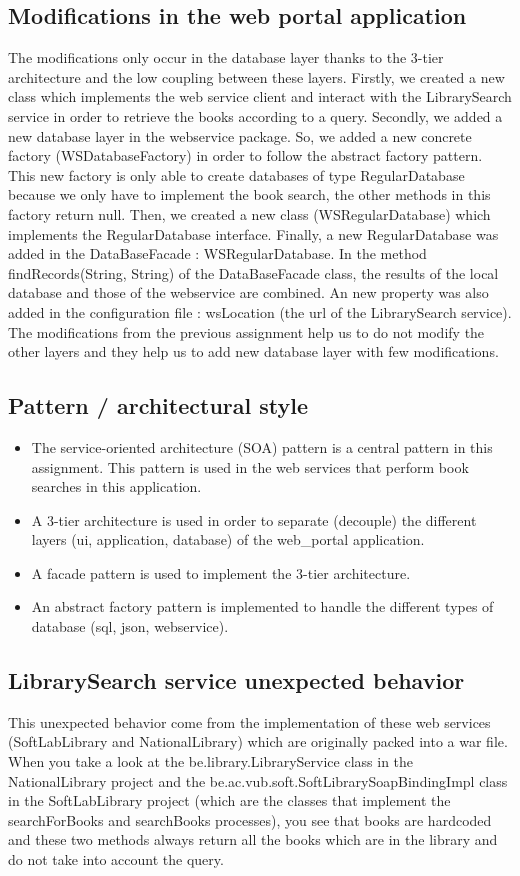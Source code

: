 \documentclass[a4paper,10pt]{article}
\begin{document}
\subsection{Modifications in the web portal application}
The modifications only occur in the database layer thanks to the 3-tier architecture and the low coupling between these layers. Firstly, we created a new class which implements the web service client and interact with the LibrarySearch service in order to retrieve the books according to a query. Secondly, we added a new database layer in the webservice package. So, we added a new concrete factory (WSDatabaseFactory) in order to follow the abstract factory pattern. This new factory is only able to create databases of type RegularDatabase because we only have to implement the book search, the other methods in this factory return null. Then, we created a new class (WSRegularDatabase) which implements the RegularDatabase interface. Finally, a new RegularDatabase was added in the DataBaseFacade : WSRegularDatabase. In the method findRecords(String, String) of the DataBaseFacade class, the results of the local database and those of the webservice are combined. An new property was also added in the configuration file : wsLocation (the url of the LibrarySearch service).\\
The modifications from the previous assignment help us to do not modify the other layers and they help us to add new database layer with few modifications.

\subsection{Pattern / architectural style}
\begin{itemize}
\item The service-oriented architecture (SOA) pattern is a central pattern in this assignment. This pattern is used in the web services that perform book searches in this application.
\item A 3-tier architecture is used in order to separate (decouple) the different layers (ui, application, database) of the web\_portal application.
\item A facade pattern is used to implement the 3-tier architecture.
\item An abstract factory pattern is implemented to handle the different types of database (sql, json, webservice).
\end{itemize}


\subsection{LibrarySearch service unexpected behavior}
This unexpected behavior come from the implementation of these web services (SoftLabLibrary and NationalLibrary) which are originally packed into a war file. When you take a look at the be.library.LibraryService class in the NationalLibrary project and the be.ac.vub.soft.SoftLibrarySoapBindingImpl class in the SoftLabLibrary project (which are the classes that implement the searchForBooks and searchBooks processes), you see that books are hardcoded and these two methods always return all the books which are in the library and do not take into account the query.
\end{document}
